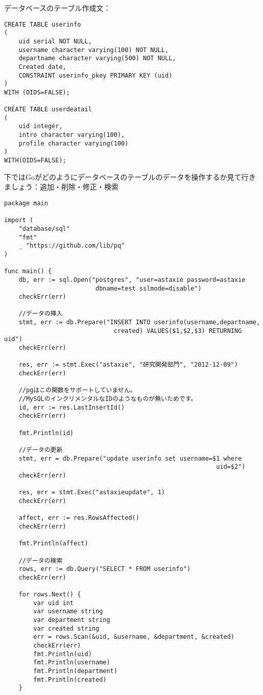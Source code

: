 データベースのテーブル作成文：


\begin{lstlisting}[numbers=none]
CREATE TABLE userinfo
(
    uid serial NOT NULL,
    username character varying(100) NOT NULL,
    departname character varying(500) NOT NULL,
    Created date,
    CONSTRAINT userinfo_pkey PRIMARY KEY (uid)
)
WITH (OIDS=FALSE);

CREATE TABLE userdeatail
(
    uid integer,
    intro character varying(100),
    profile character varying(100)
)
WITH(OIDS=FALSE);
\end{lstlisting}

下ではGoがどのようにデータベースのテーブルのデータを操作するか見て行きましょう：追加・削除・修正・検索

\begin{lstlisting}[numbers=none]
package main

import (
    "database/sql"
    "fmt"
    _ "https://github.com/lib/pq"
)

func main() {
    db, err := sql.Open("postgres", "user=astaxie password=astaxie
                         dbname=test sslmode=disable")
    checkErr(err)

    //データの挿入
    stmt, err := db.Prepare("INSERT INTO userinfo(username,departname,
                              created) VALUES($1,$2,$3) RETURNING uid")
    checkErr(err)

    res, err := stmt.Exec("astaxie", "研究開発部門", "2012-12-09")
    checkErr(err)

    //pgはこの関数をサポートしていません。
    //MySQLのインクリメンタルなIDのようなものが無いためです。
    id, err := res.LastInsertId()
    checkErr(err)

    fmt.Println(id)

    //データの更新
    stmt, err = db.Prepare("update userinfo set username=$1 where
                                                          uid=$2")
    checkErr(err)

    res, err = stmt.Exec("astaxieupdate", 1)
    checkErr(err)

    affect, err := res.RowsAffected()
    checkErr(err)

    fmt.Println(affect)

    //データの検索
    rows, err := db.Query("SELECT * FROM userinfo")
    checkErr(err)

    for rows.Next() {
        var uid int
        var username string
        var department string
        var created string
        err = rows.Scan(&uid, &username, &department, &created)
        checkErr(err)
        fmt.Println(uid)
        fmt.Println(username)
        fmt.Println(department)
        fmt.Println(created)
    }


\end{lstlisting}
